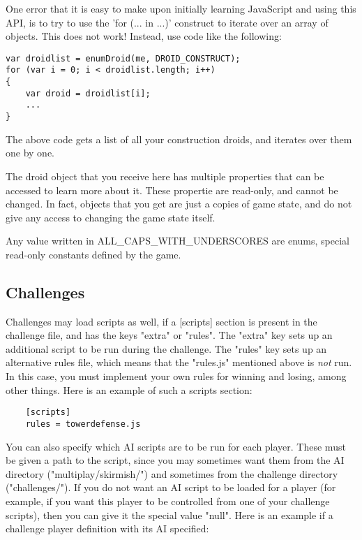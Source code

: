 \documentclass[12pt]{article}
\begin{document}
One error that it is easy to make upon initially learning JavaScript and using this API, is to try to use
the 'for (... in ...)' construct to iterate over an array of objects. This does not work! Instead, use code
like the following:

\begin{lstlisting}
var droidlist = enumDroid(me, DROID_CONSTRUCT);
for (var i = 0; i < droidlist.length; i++)
{
	var droid = droidlist[i];
	...
}
\end{lstlisting}

The above code gets a list of all your construction droids, and iterates over them one by one.

The droid object that you receive here has multiple properties that can be accessed to learn more about it. 
These propertie are read-only, and cannot be changed. In fact, objects that you get are just a copies of 
game state, and do not give any access to changing the game state itself.

Any value written in ALL_CAPS_WITH_UNDERSCORES are enums, special read-only constants defined by the
game.

\subsection{Challenges}

Challenges may load scripts as well, if a [scripts] section is present in the challenge file, and has the keys 
"extra" or "rules". The "extra" key sets up an additional script to be run during the challenge. The "rules"
key sets up an alternative rules file, which means that the "rules.js" mentioned above is \emph{not} run. In
this case, you must implement your own rules for winning and losing, among other things. Here is an example
of such a scripts section:

\begin{verbatim}
	[scripts]
	rules = towerdefense.js
\end{verbatim}

You can also specify which AI scripts are to be run for each player. These must be given a path to the script,
since you may sometimes want them from the AI directory ("multiplay/skirmish/") and sometimes from the challenge
directory ("challenges/"). If you do not want an AI script to be loaded for a player (for example, if you want 
this player to be controlled from one of your challenge scripts), then you can give it the special value "null". 
Here is an example if a challenge player definition with its AI specified:
\end{document}
